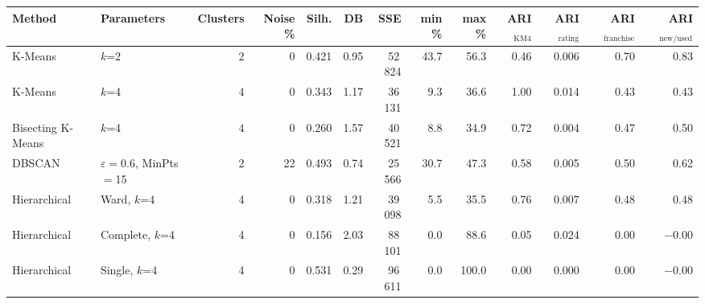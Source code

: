 \begin{tabular}{@{}llrrrrrrrrrrr@{}}
\toprule
Method & Parameters & Clusters & Noise \% & Silh. & DB & SSE & min \% & max \% & ARI$_\mathrm{KM4}$ & ARI$_\mathrm{rating}$ & ARI$_\mathrm{franchise}$ & ARI$_\mathrm{new/used}$ \\
\midrule
K-Means & $k$=2 & 2 & 0 & 0.421 & 0.95 & 52\,824 & 43.7 & 56.3 & 0.46 & 0.006 & 0.70 & 0.83 \\
K-Means & $k$=4 & 4 & 0 & 0.343 & 1.17 & 36\,131 & 9.3 & 36.6 & 1.00 & 0.014 & 0.43 & 0.43 \\
Bisecting K-Means & $k$=4 & 4 & 0 & 0.260 & 1.57 & 40\,521 & 8.8 & 34.9 & 0.72 & 0.004 & 0.47 & 0.50 \\
DBSCAN & $\varepsilon{=}0.6$, MinPts$=$15 & 2 & 22 & 0.493 & 0.74 & 25\,566 & 30.7 & 47.3 & 0.58 & 0.005 & 0.50 & 0.62 \\
Hierarchical & Ward, $k$=4 & 4 & 0 & 0.318 & 1.21 & 39\,098 & 5.5 & 35.5 & 0.76 & 0.007 & 0.48 & 0.48 \\
Hierarchical & Complete, $k$=4 & 4 & 0 & 0.156 & 2.03 & 88\,101 & 0.0 & 88.6 & 0.05 & 0.024 & 0.00 & $-$0.00 \\
Hierarchical & Single, $k$=4 & 4 & 0 & 0.531 & 0.29 & 96\,611 & 0.0 & 100.0 & 0.00 & 0.000 & 0.00 & $-$0.00 \\
\bottomrule
\end{tabular}
